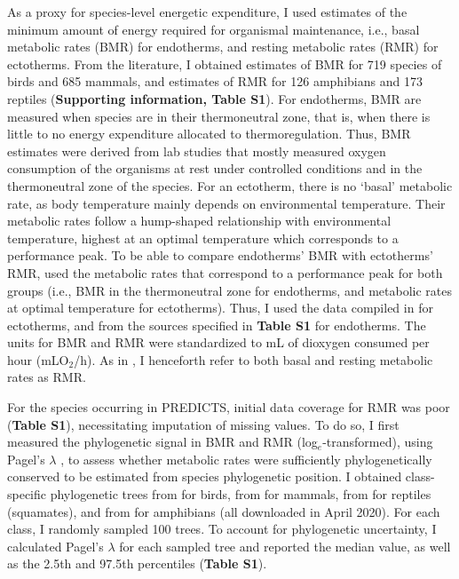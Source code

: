 As a proxy for species-level energetic expenditure, I used estimates of the minimum amount of energy required for organismal maintenance, i.e., basal metabolic rates (BMR) for endotherms, and resting metabolic rates (RMR) for ectotherms. From the literature, I obtained estimates of BMR for 719 species of birds and 685 mammals, and estimates of RMR for 126 amphibians and 173 reptiles (\textbf{Supporting information, Table S1}). For endotherms, BMR are measured when species are in their thermoneutral zone, that is, when there is little to no energy expenditure allocated to thermoregulation. Thus, BMR estimates were derived from lab studies that mostly measured oxygen consumption of the organisms at rest under controlled conditions and in the thermoneutral zone of the species. For an ectotherm, there is no `basal' metabolic rate, as body temperature mainly depends on environmental temperature. Their metabolic rates follow a hump-shaped relationship with environmental temperature, highest at an optimal temperature which corresponds to a performance peak. To be able to compare endotherms’ BMR with ectotherms’ RMR, \citet{Stark2020} used the metabolic rates that correspond to a performance peak for both groups (i.e., BMR in the thermoneutral zone for endotherms, and metabolic rates at optimal temperature for ectotherms). Thus, I used the data compiled in \citet{Stark2020} for ectotherms, and from the sources specified in \textbf{Table S1} for endotherms. The units for BMR and RMR were standardized to mL of dioxygen consumed per hour (mLO$_2$/h). As in \citet{Stark2020}, I henceforth refer to both basal and resting metabolic rates as RMR. 

For the species occurring in PREDICTS, initial data coverage for RMR was poor (\textbf{Table S1}), necessitating imputation of missing values. To do so, I first measured the phylogenetic signal in BMR and RMR (log$_e$-transformed), using Pagel’s $\lambda$ \citep{Pagel1999}, to assess whether metabolic rates were sufficiently phylogenetically conserved to be estimated from species phylogenetic position. I obtained class-specific phylogenetic trees from \citet{Jetz2012} for birds, from \citet{Faurby2018, Faurby2020} for mammals, from \citep{Tonini2016} for reptiles (squamates), and from \citet{Jetz2018} for amphibians (all downloaded in April 2020). For each class, I randomly sampled 100 trees. To account for phylogenetic uncertainty, I calculated Pagel’s $\lambda$ for each sampled tree and reported the median value, as well as the 2.5th and 97.5th percentiles (\textbf{Table S1}).  


